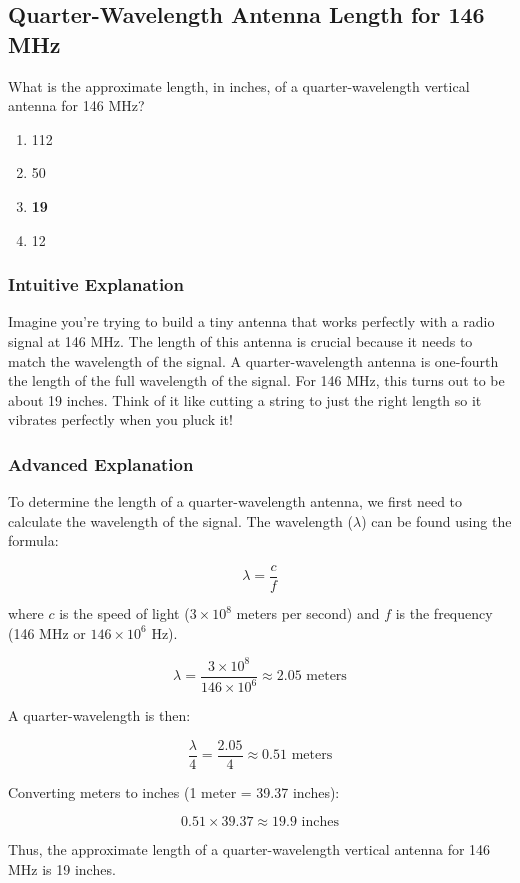 \subsection{Quarter-Wavelength Antenna Length for 146 MHz}
\label{T9A08}

\begin{tcolorbox}[colback=gray!10!white,colframe=black!75!black,title=T9A08]
What is the approximate length, in inches, of a quarter-wavelength vertical antenna for 146 MHz?
\begin{enumerate}[noitemsep]
    \item 112
    \item 50
    \item \textbf{19}
    \item 12
\end{enumerate}
\end{tcolorbox}

\subsubsection{Intuitive Explanation}
Imagine you're trying to build a tiny antenna that works perfectly with a radio signal at 146 MHz. The length of this antenna is crucial because it needs to match the wavelength of the signal. A quarter-wavelength antenna is one-fourth the length of the full wavelength of the signal. For 146 MHz, this turns out to be about 19 inches. Think of it like cutting a string to just the right length so it vibrates perfectly when you pluck it!

\subsubsection{Advanced Explanation}
To determine the length of a quarter-wavelength antenna, we first need to calculate the wavelength of the signal. The wavelength (\(\lambda\)) can be found using the formula:

\[
\lambda = \frac{c}{f}
\]

where \(c\) is the speed of light (\(3 \times 10^8\) meters per second) and \(f\) is the frequency (146 MHz or \(146 \times 10^6\) Hz). 

\[
\lambda = \frac{3 \times 10^8}{146 \times 10^6} \approx 2.05 \text{ meters}
\]

A quarter-wavelength is then:

\[
\frac{\lambda}{4} = \frac{2.05}{4} \approx 0.51 \text{ meters}
\]

Converting meters to inches (1 meter = 39.37 inches):

\[
0.51 \times 39.37 \approx 19.9 \text{ inches}
\]

Thus, the approximate length of a quarter-wavelength vertical antenna for 146 MHz is 19 inches.